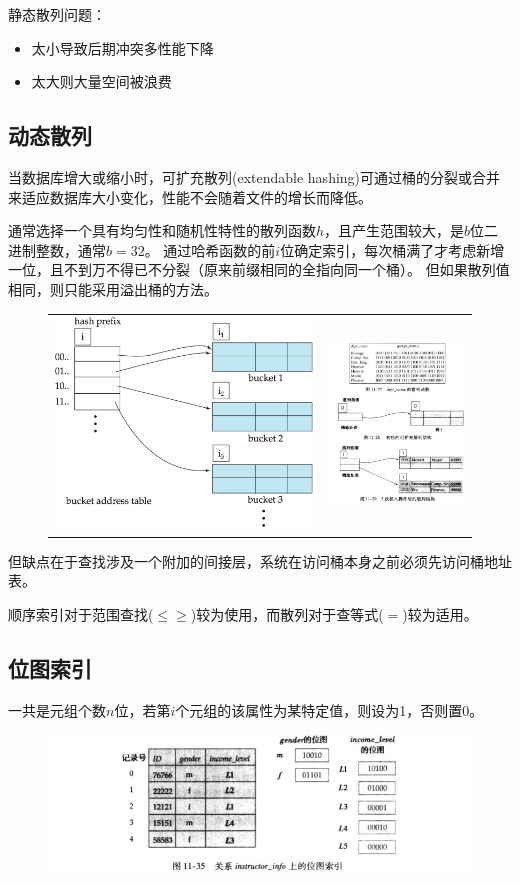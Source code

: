 静态散列问题：
\begin{itemize}
	\item 太小导致后期冲突多性能下降
	\item 太大则大量空间被浪费
\end{itemize}

\subsection{动态散列}
当数据库增大或缩小时，可扩充散列(extendable hashing)可通过桶的分裂或合并来适应数据库大小变化，性能不会随着文件的增长而降低。

通常选择一个具有均匀性和随机性特性的散列函数$h$，且产生范围较大，是$b$位二进制整数，通常$b=32$。
通过哈希函数的前$i$位确定索引，每次桶满了才考虑新增一位，且不到万不得已不分裂（原来前缀相同的全指向同一个桶）。
但如果散列值相同，则只能采用溢出桶的方法。
\begin{figure}[H]
\centering
\begin{tabular}{cc}
\includegraphics[width=0.5\linewidth]{fig/extendable_hash.png}&
\includegraphics[width=0.5\linewidth]{fig/extendable_hash_eg.png}
\end{tabular}
\end{figure}
但缺点在于查找涉及一个附加的间接层，系统在访问桶本身之前必须先访问桶地址表。

顺序索引对于范围查找($\leq\geq$)较为使用，而散列对于查等式($=$)较为适用。

\subsection{位图索引}
一共是元组个数$n$位，若第$i$个元组的该属性为某特定值，则设为1，否则置0。
\begin{figure}[H]
\centering
\includegraphics[width=0.9\linewidth]{fig/bitmap.png}
\end{figure}